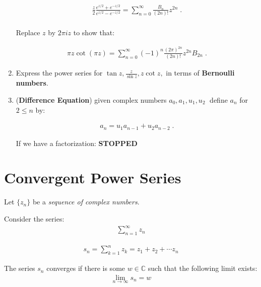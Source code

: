 \begin{enumerate}
  \begin{align*}
    \frac{z}{2} \frac{e^{z/2} + e^{-z/2}}{e^{z/2} - e^{-z/2}} = \sum_{n = 0}^\infty \frac{B_n}{(2n)!}z^{2n} \;. \\
  \end{align*}

  Replace $z$ by $2\pi i z$ to show that:

  \begin{align*}
    \pi z \cot(\pi z) = \sum_{n = 0}^\infty (-1)^n \frac{(2\pi)^{2n}}{(2n)!} z^{2n} B_{2n} \;.
  \end{align*}

  \item Express the power series for $\tan z , \frac{z}{\sin z}, z \cot z ,$ in terms of \textbf{Bernoulli numbers}.

  \item (\textbf{Difference Equation}) given complex numbers $a_0, a_1, u_1, u_2 \;$ define $a_n$ for $2 \leq n$ by:

  \begin{align*}
    a_n = u_1 a_{n - 1} +u_2 a_{n - 2} \;.
  \end{align*}

  If we have a factorization: \textbf{STOPPED}
\end{enumerate}

\section{Convergent Power Series}
Let ${ \{ z_n \} }$ be a \emph{sequence of complex numbers}.

Consider the series:
\begin{align*}
  \sum_{n = 1}^{\infty} z_n
\end{align*}

\begin{defn}
  \begin{align*}
    s_n = \sum_{k = 1}^{n} z_k = z_1 + z_2 + \cdots z_n
  \end{align*}
\end{defn}

\begin{defn}
  The series $s_n$ converges if there is some $w \in \mathbb{C}$ such that the following limit exists:
  \begin{align*}
    \lim_{n \to \infty}s_n = w
  \end{align*}
\end{defn}

